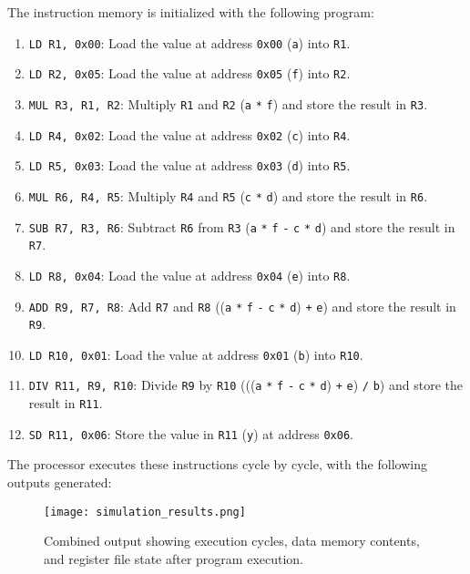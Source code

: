 \documentclass[12pt]{article}
\begin{document}
The instruction memory is initialized with the following program:
\begin{enumerate}
    \item \texttt{LD R1, 0x00}: Load the value at address \texttt{0x00} (\texttt{a}) into \texttt{R1}.
    \item \texttt{LD R2, 0x05}: Load the value at address \texttt{0x05} (\texttt{f}) into \texttt{R2}.
    \item \texttt{MUL R3, R1, R2}: Multiply \texttt{R1} and \texttt{R2} (\texttt{a} \texttt{*} \texttt{f}) and store the result in \texttt{R3}.
    \item \texttt{LD R4, 0x02}: Load the value at address \texttt{0x02} (\texttt{c}) into \texttt{R4}.
    \item \texttt{LD R5, 0x03}: Load the value at address \texttt{0x03} (\texttt{d}) into \texttt{R5}.
    \item \texttt{MUL R6, R4, R5}: Multiply \texttt{R4} and \texttt{R5} (\texttt{c} \texttt{*} \texttt{d}) and store the result in \texttt{R6}.
    \item \texttt{SUB R7, R3, R6}: Subtract \texttt{R6} from \texttt{R3} (\texttt{a} \texttt{*} \texttt{f} \texttt{-} \texttt{c} \texttt{*} \texttt{d}) and store the result in \texttt{R7}.
    \item \texttt{LD R8, 0x04}: Load the value at address \texttt{0x04} (\texttt{e}) into \texttt{R8}.
    \item \texttt{ADD R9, R7, R8}: Add \texttt{R7} and \texttt{R8} ((\texttt{a} \texttt{*} \texttt{f} \texttt{-} \texttt{c} \texttt{*} \texttt{d}) \texttt{+} \texttt{e}) and store the result in \texttt{R9}.
    \item \texttt{LD R10, 0x01}: Load the value at address \texttt{0x01} (\texttt{b}) into \texttt{R10}.
    \item \texttt{DIV R11, R9, R10}: Divide \texttt{R9} by \texttt{R10} (((\texttt{a} \texttt{*} \texttt{f} \texttt{-} \texttt{c} \texttt{*} \texttt{d}) \texttt{+} \texttt{e}) \texttt{/} \texttt{b}) and store the result in \texttt{R11}.
    \item \texttt{SD R11, 0x06}: Store the value in \texttt{R11} (\texttt{y}) at address \texttt{0x06}.
\end{enumerate}

The processor executes these instructions cycle by cycle, with the following outputs generated:

\begin{figure}[ht!]
\centering
\texttt{[image: simulation\_results.png]}
\caption{Combined output showing execution cycles, data memory contents, and register file state after program execution.}
\label{fig:simulation_results}
\end{figure}
\end{document}
